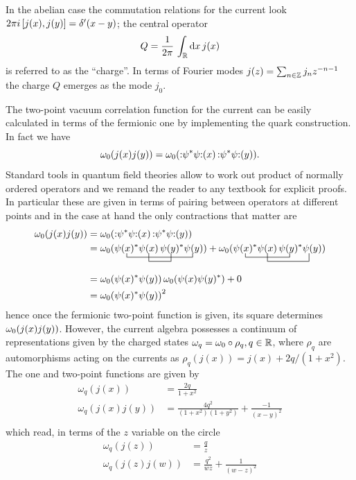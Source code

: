 \bigskip
In the abelian case the commutation relations for the 
current look $2\pi i\,[j(x),j(y)]=\delta'(x-y)$; the
central operator
\begin{equation}
\label{charge}
Q=\frac{1}{2\pi}\,\int_{\mathbb{R}}\textrm{d} x\,j(x)
\end{equation}
is referred to as the ``charge''. In terms of Fourier modes
$j(z)=\sum_{n\in\mathbb{Z}}j_n z^{-n-1}$ the charge 
$Q$ emerges as the mode $j_0$.

\bigskip 
The two-point vacuum correlation function for the current 
can be easily calculated in terms of the fermionic
one by implementing the quark construction. In fact
we have
\[
\vac(j(x)j(y))=\vac(\wick{\psi^*\psi}(x)\,
\wick{\psi^*\psi}(y)).
\]
Standard tools in quantum field theories allow
to work out product of normally ordered operators 
and we remand the reader to any textbook for 
explicit proofs. In particular these are given 
in terms of pairing between operators at 
different points and in the case at hand the
only contractions that matter are
\begin{align*}
\vac(j(x)j(y))&=\vac(\wick{\psi^*\psi}(x)\,
\wick{\psi^*\psi}(y))\\
&=\vac(
\bcontraction{}{\psi(x)^*}{\psi(x)\psi(y)^*}{\psi(y)}
\bcontraction[2ex]{\psi(x)^*}{\psi(x)}{}{\psi(y)^*}
\psi(x)^*\psi(x)\,\psi(y)^*\psi(y))+
\vac(
\bcontraction{}{\psi(x)^*}{\psi(x)}{\psi(y)^*}
\bcontraction[2ex]{\psi(x)^*}{\psi(x)}{\psi(y)}{\psi(y)^*}
\psi(x)^*\psi(x)\,\psi(y)^*\psi(y))\\[2ex]
&=\vac(\psi(x)^*\psi(y))\,\vac(\psi(x)\psi(y)^*)+0\\
&={\vac(\psi(x)^*\psi(y))}^2
\end{align*}
hence once the fermionic two-point function is given,
its square determines $\omega_0(j(x)j(y))$. However,
the current algebra possesses a continuum of representations
given by the charged states $\omega_q=\omega_0\circ\rho_q, q\in\mathbb{R}$, 
where $\rho_q$ are automorphisms acting on the currents as
$\rho_q(j(x))=j(x)+2q/(1+x^2)$. The one and two-point functions
are given by
\begin{align*}
\omega_q(j(x))&=\frac{2q}{1+x^2}\\
\omega_q(j(x)j(y))&=\frac{4q^2}{(1+x^2)(1+y^2)}+
\frac{-1}{(x-y)^2}\\
\end{align*}
which read, in terms of the $z$ variable on the circle
\begin{align*}
\omega_q(j(z))&=\frac{q}{z}\\
\omega_q(j(z)j(w))&=\frac{q^2}{wz}+\frac{1}{(w-z)^2}
\end{align*}

